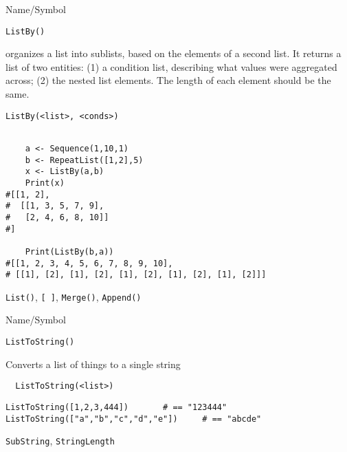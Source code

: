 \begin{desc}{Name/Symbol}
\item[Name/Symbol]	\verb+ListBy()+

\item[Description]	organizes a list into sublists, based on the
  elements of a second list.  It returns a list of two entities: (1) a
  condition list, describing what values were aggregated across; (2)
  the nested list elements.  The length of each element should be the same.

\item[Usage]
\begin{verbatim}
ListBy(<list>, <conds>)
\end{verbatim}

\item[Example]
\begin{verbatim}

	a <- Sequence(1,10,1)
    b <- RepeatList([1,2],5)
    x <- ListBy(a,b)
    Print(x)
#[[1, 2],
#  [[1, 3, 5, 7, 9],
#   [2, 4, 6, 8, 10]]
#]

    Print(ListBy(b,a))
#[[1, 2, 3, 4, 5, 6, 7, 8, 9, 10],
# [[1], [2], [1], [2], [1], [2], [1], [2], [1], [2]]]

\end{verbatim}

\item[See Also]	\verb+List()+, \verb+[ ]+, \verb+Merge()+, \verb+Append()+
\end{desc}
 
\begin{desc}{Name/Symbol}
\item[Name/Symbol]	\verb+ListToString()+

\item[Description]	Converts a list of things to a single string

\item[Usage]
\begin{verbatim}
  ListToString(<list>)
\end{verbatim}

\item[Example]
\begin{verbatim}
ListToString([1,2,3,444])		# == "123444"
ListToString(["a","b","c","d","e"])		# == "abcde"

\end{verbatim}

\item[See Also] \verb+SubString+, \verb+StringLength+
\end{desc}

